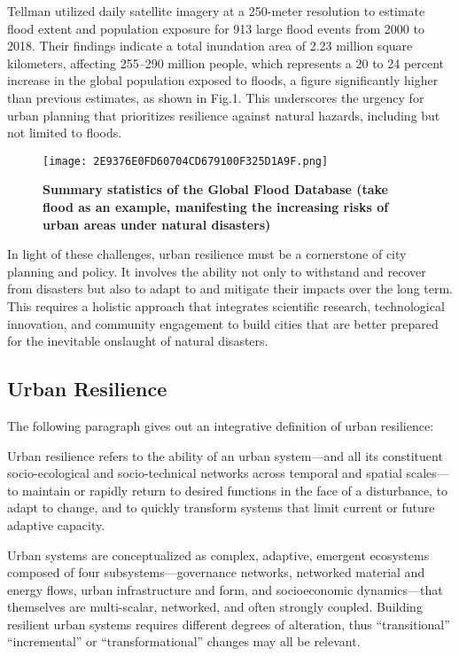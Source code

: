 \documentclass[conference]{IEEEtran}
\begin{document}
Tellman utilized daily satellite imagery at a 250-meter resolution to estimate flood extent and population exposure for 913 large flood events from 2000 to 2018. Their findings indicate a total inundation area of 2.23 million square kilometers, affecting 255–290 million people, which represents a 20 to 24 percent increase in the global population exposed to floods, a figure significantly higher than previous estimates, as shown in Fig.1. This underscores the urgency for urban planning that prioritizes resilience against natural hazards, including but not limited to floods.

\begin{figure}[h]
    \centering
    \texttt{[image: 2E9376E0FD60704CD679100F325D1A9F.png]}
    \caption{\textbf{Summary statistics of the Global Flood Database (take flood as an example, manifesting the increasing risks of urban areas under natural disasters)}}
    \label{fig:enter-label}
\end{figure}

In light of these challenges, urban resilience must be a cornerstone of city planning and policy. It involves the ability not only to withstand and recover from disasters but also to adapt to and mitigate their impacts over the long term. This requires a holistic approach that integrates scientific research, technological innovation, and community engagement to build cities that are better prepared for the inevitable onslaught of natural disasters.

\subsection{Urban Resilience}
The following paragraph gives out an integrative definition of urban resilience:

Urban resilience refers to the ability of an urban system---and all its constituent socio-ecological and socio-technical networks across temporal and spatial scales---to maintain or rapidly return to desired functions in the face of a disturbance, to adapt to change, and to quickly transform systems that limit current or future adaptive capacity\cite{b11}. 

Urban systems are conceptualized as complex, adaptive, emergent ecosystems composed of four subsystems—governance networks, networked material and energy flows, urban infrastructure and form, and socioeconomic dynamics—that themselves are multi-scalar, networked, and often strongly coupled\cite{b11}. Building resilient urban systems requires different degrees of alteration, thus “transitional” “incremental” or “transformational” changes may all be relevant\cite{b12,b13}.
\end{document}
